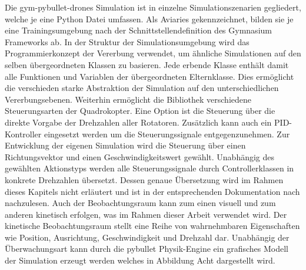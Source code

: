 Die gym-pybullet-drones Simulation ist in einzelne Simulationszenarien gegliedert, welche je eine Python Datei umfassen.
Als Aviaries gekennzeichnet, bilden sie je eine Trainingsumgebung nach der Schnittstellendefinition des Gymnasium Frameworks ab.
In der Struktur der Simulationsumgebung wird das Programmierkonzept der Vererbung verwendet, um ähnliche Simulationen auf den selben übergeordneten Klassen zu basieren.
Jede erbende Klasse enthält damit alle Funktionen und Variablen der übergeordneten Elternklasse.
Dies ermöglicht die verschieden starke Abstraktion der Simulation auf den unterschiedlichen Vererbungsebenen.
Weiterhin ermöglicht die Bibliothek verschiedene Steuerungsarten der Quadrokopter. 
Eine Option ist die Steuerung über die direkte Vorgabe der Drehzahlen aller Rotatoren. 
Zusätzlich kann auch ein PID-Kontroller eingesetzt werden um die Steuerungssignale entgegenzunehmen.
Zur Entwicklung der eigenen Simulation wird die Steuerung über einen Richtungsvektor und einen Geschwindigkeitswert gewählt.
Unabhängig des gewählten Aktionstyps werden alle Steuerungssignale durch Controllerklassen in konkrete Drehzahlen übersetzt.
Dessen genaue Übersetzung wird im Rahmen dieses Kapitels nicht erläutert und ist in der entsprechenden Dokumentation nach \cite[]{Panerati.332021} nachzulesen.
Auch der Beobachtungsraum kann zum einen visuell und zum anderen kinetisch erfolgen, was im Rahmen dieser Arbeit verwendet wird.
Der kinetische Beobachtungsraum stellt eine Reihe von wahrnehmbaren Eigenschaften wie Position, Ausrichtung, Geschwindigkeit und Drehzahl dar.
Unabhängig der Überwachungsart kann durch die pybullet Physik-Engine ein grafisches Modell der Simulation erzeugt werden welches in Abbildung Acht dargestellt wird.

